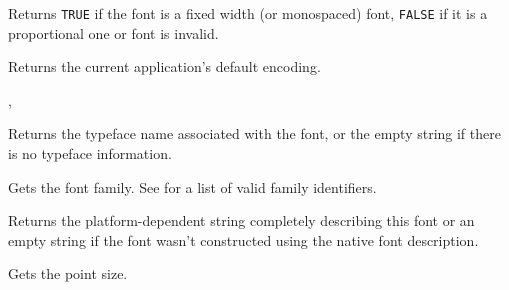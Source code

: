
Returns {\tt TRUE} if the font is a fixed width (or monospaced) font, 
{\tt FALSE} if it is a proportional one or font is invalid.

\label{wxfontgetdefaultencoding}


Returns the current application's default encoding.


, 

\label{wxfontgetfacename}


Returns the typeface name associated with the font, or the empty string if there is no
typeface information.



\label{wxfontgetfamily}


Gets the font family. See  for a list of valid
family identifiers.



\label{wxfontgetnativefontinfodesc}


Returns the platform-dependent string completely describing this font or an
empty string if the font wasn't constructed using the native font description.



\label{wxfontgetpointsize}


Gets the point size.


